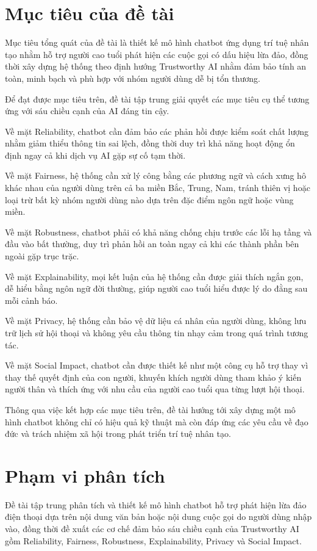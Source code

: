 \section{Mục tiêu của đề tài}
Mục tiêu tổng quát của đề tài là thiết kế mô hình chatbot ứng dụng trí tuệ nhân tạo nhằm hỗ trợ người cao tuổi phát hiện các cuộc gọi có dấu hiệu lừa đảo, đồng thời xây dựng hệ thống theo định hướng Trustworthy AI nhằm đảm bảo tính an toàn, minh bạch và phù hợp với nhóm người dùng dễ bị tổn thương.

Để đạt được mục tiêu trên, đề tài tập trung giải quyết các mục tiêu cụ thể tương ứng với sáu chiều cạnh của AI đáng tin cậy.

Về mặt Reliability, chatbot cần đảm bảo các phản hồi được kiểm soát chất lượng nhằm giảm thiểu thông tin sai lệch, đồng thời duy trì khả năng hoạt động ổn định ngay cả khi dịch vụ AI gặp sự cố tạm thời.

Về mặt Fairness, hệ thống cần xử lý công bằng các phương ngữ và cách xưng hô khác nhau của người dùng trên cả ba miền Bắc, Trung, Nam, tránh thiên vị hoặc loại trừ bất kỳ nhóm người dùng nào dựa trên đặc điểm ngôn ngữ hoặc vùng miền.

Về mặt Robustness, chatbot phải có khả năng chống chịu trước các lỗi hạ tầng và đầu vào bất thường, duy trì phản hồi an toàn ngay cả khi các thành phần bên ngoài gặp trục trặc.

Về mặt Explainability, mọi kết luận của hệ thống cần được giải thích ngắn gọn, dễ hiểu bằng ngôn ngữ đời thường, giúp người cao tuổi hiểu được lý do đằng sau mỗi cảnh báo.

Về mặt Privacy, hệ thống cần bảo vệ dữ liệu cá nhân của người dùng, không lưu trữ lịch sử hội thoại và không yêu cầu thông tin nhạy cảm trong quá trình tương tác.

Về mặt Social Impact, chatbot cần được thiết kế như một công cụ hỗ trợ thay vì thay thế quyết định của con người, khuyến khích người dùng tham khảo ý kiến người thân và thích ứng với nhu cầu của người cao tuổi qua từng lượt hội thoại.

Thông qua việc kết hợp các mục tiêu trên, đề tài hướng tới xây dựng một mô hình chatbot không chỉ có hiệu quả kỹ thuật mà còn đáp ứng các yêu cầu về đạo đức và trách nhiệm xã hội trong phát triển trí tuệ nhân tạo.

\section{Phạm vi phân tích}
Đề tài tập trung phân tích và thiết kế mô hình chatbot hỗ trợ phát hiện lừa đảo điện thoại dựa trên nội dung văn bản hoặc nội dung cuộc gọi do người dùng nhập vào, đồng thời đề xuất các cơ chế đảm bảo sáu chiều cạnh của Trustworthy AI gồm Reliability, Fairness, Robustness, Explainability, Privacy và Social Impact.

